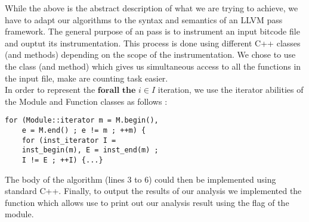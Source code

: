 While the above is the abstract description of what we are trying to achieve, we have to adapt our algorithms to the syntax and semantics of an LLVM  pass framework. The general purpose of an  pass is to instrument an input bitcode file and ouptut its instrumentation. This process is done using different C++ classes (and methods) depending on the scope of the instrumentation. We chose to use the  class (and  method) which gives us simultaneous access to all the functions in the input file, make are counting task easier. \\

In order to represent the $\textbf{forall the } i \in I$ iteration, we use the iterator abilities of the Module and Function classes as follows :

\begin{frame}[fragile]
\begin{lstlisting}
for (Module::iterator m = M.begin(),
    e = M.end() ; e != m ; ++m) {
    for (inst_iterator I = 
    inst_begin(m), E = inst_end(m) ;
    I != E ; ++I) {...}
\end{lstlisting}
\end{frame}

The body of the algorithm (lines 3 to 6) could then be implemented using standard C++. Finally, to output the results of our analysis we implemented the  function which allows use to print out our analysis result using the  flag of the  module. 




